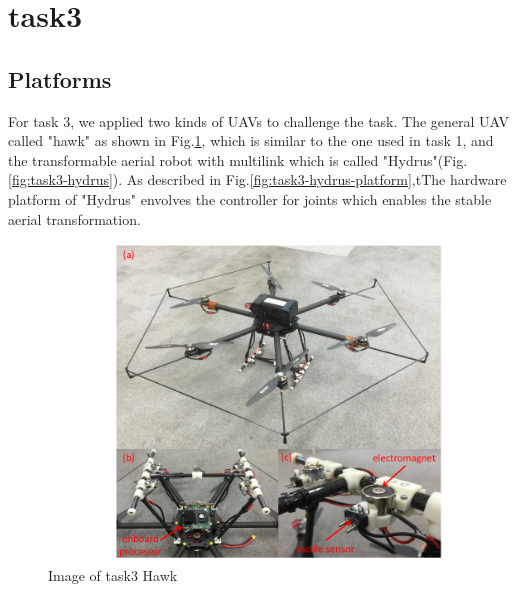 \documentclass{standalone}
\begin{document}
\section{task3}
\subsection{Platforms}
For task 3, we applied two kinds of UAVs to challenge the task. The general UAV called "hawk" as shown in Fig.\ref{fig:task3-hawk}, which is similar to the one used in task 1, and the transformable aerial robot with multilink which is called "Hydrus"(Fig.\ref{fig:task3-hydrus}). As described in Fig.\ref{fig:task3-hydrus-platform},tThe hardware platform of "Hydrus" envolves the controller for joints which enables the stable aerial transformation.

\begin{figure}[h]
  \begin{center}
    \includegraphics[clip,  bb=115 4 666 535,  width=\columnwidth]{sections/task3/images/task3-tarrot810.pdf}
    \caption{Image of task3 Hawk}
    \label{fig:task3-hawk}
  \end{center}
\end{figure} 
\end{document}
